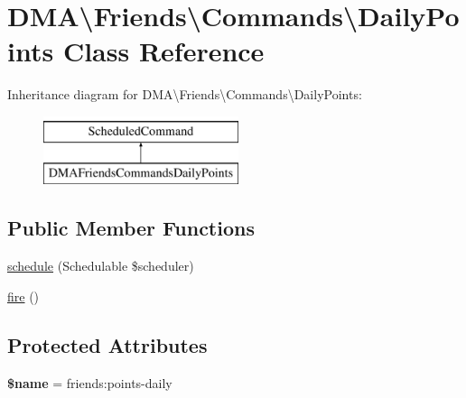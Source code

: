 \hypertarget{classDMA_1_1Friends_1_1Commands_1_1DailyPoints}{}\section{D\+M\+A\textbackslash{}Friends\textbackslash{}Commands\textbackslash{}Daily\+Points Class Reference}
\label{classDMA_1_1Friends_1_1Commands_1_1DailyPoints}
Inheritance diagram for D\+M\+A\textbackslash{}Friends\textbackslash{}Commands\textbackslash{}Daily\+Points\+:\begin{figure}[H]
\begin{center}
\leavevmode
\includegraphics[height=2.000000cm]{da/d3a/classDMA_1_1Friends_1_1Commands_1_1DailyPoints}
\end{center}
\end{figure}
\subsection*{Public Member Functions}
\begin{DoxyCompactItemize}
\item 
\hyperlink{classDMA_1_1Friends_1_1Commands_1_1DailyPoints_a9b86a3c5fd799e43cf001ae955501c0c}{schedule} (Schedulable \$scheduler)
\item 
\hyperlink{classDMA_1_1Friends_1_1Commands_1_1DailyPoints_a744a2cce8db836d1e2ae4db904361b1e}{fire} ()
\end{DoxyCompactItemize}
\subsection*{Protected Attributes}
\begin{DoxyCompactItemize}
\item 
\hypertarget{classDMA_1_1Friends_1_1Commands_1_1DailyPoints_affe8b91e4538363d05401b06b59ec6b0}{}{\bfseries \$name} = \textquotesingle{}friends\+:points-\/daily\textquotesingle{}\label{classDMA_1_1Friends_1_1Commands_1_1DailyPoints_affe8b91e4538363d05401b06b59ec6b0}

\end{DoxyCompactItemize}


